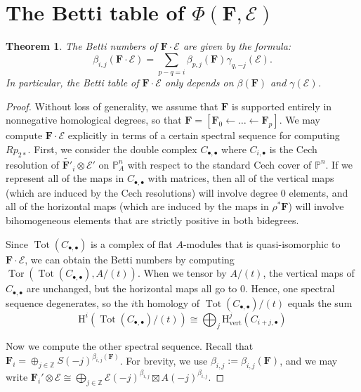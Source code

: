 \documentclass[12pt]{amsart}
\newtheorem{theorem}[lemma]{Theorem}
\theoremstyle{definition}
\theoremstyle{remark}
\newcommand{\Tor}{\operatorname{Tor}}
\newcommand{\Tot}{\operatorname{Tot}}
\newcommand{\PP}{\mathbb{P}}
\newcommand{\HH}{\mathrm{H}}
\newcommand{\ZZ}{\mathbb{Z}}
\newcommand{\cE}{\mathcal{E}}
\newcommand{\FF}{\mathbf{F}}
\begin{document}
\section{The Betti table of $\Phi(\FF,\cE)$}\label{sec:duality pairing}

\begin{theorem}\label{thm:betti numbers of pairing}
The Betti numbers of $\FF\cdot \cE$ are given by the formula:
\[
\beta_{i,j}(\FF\cdot \cE)=\sum_{p-q=i}  \beta_{p,j}(\FF)\gamma_{q,-j}(\cE).
\]
In particular, the Betti table of $\FF\cdot \cE$ only depends on $\beta(\FF)$ and $\gamma(\cE)$.
\end{theorem}
\begin{proof}
Without loss of generality, we assume that $\FF$ is supported entirely in nonnegative homological degrees, so that $\FF=[\FF_0\gets \dots \gets \FF_p]$.  
We may compute $\FF\cdot \cE$ explicitly in terms of a certain spectral sequence for computing $Rp_{2*}$.  First, we consider the double complex $C_{\bullet, \bullet}$ where $C_{i,\bullet}$ is the Cech resolution of $\widetilde{\FF'}_i\otimes \cE'$ on $\PP^n_A$ with respect to the standard Cech cover of $\mathbb P^n$.  If we represent all of the maps in $C_{\bullet, \bullet}$ with matrices, then all of the vertical maps (which are induced by the Cech resolutions) will involve degree $0$ elements, and all of the horizontal maps (which are induced by the maps in $\rho^*\FF$) will involve bihomogeneous elements that are strictly positive in both bidegrees.

Since $\Tot(C_{\bullet, \bullet})$ is a complex of flat $A$-modules that is quasi-isomorphic to $\FF\cdot \cE$, we can obtain the Betti numbers by computing $\Tor(\Tot(C_{\bullet, \bullet}), A/(t))$.  When we tensor by $A/(t)$, the vertical maps of $C_{\bullet, \bullet}$ are unchanged, but the horizontal maps all go to $0$.  
Hence, one spectral sequence degenerates, so the $i$th homology of $\Tot(C_{\bullet,\bullet})/(t)$ equals the sum 
\[
\HH^i(\Tot(C_{\bullet,\bullet})/(t))\cong \bigoplus_{j} \HH^j_{\text{vert}}(C_{i+j,\bullet})
\]

Now we compute the other spectral sequence.
Recall that $\FF_i=\oplus_{j\in \ZZ} S(-j)^{\beta_{i,j}(\FF)}$.  For brevity, we use $\beta_{i,j}:=\beta_{i,j}(\FF)$, and we may write $\FF_i'\otimes \cE\cong \bigoplus_{j\in \ZZ} \cE(-j)^{\beta_{i,j}}\boxtimes A(-j)^{\beta_{i,j}}$.


\end{proof}
\end{document}
